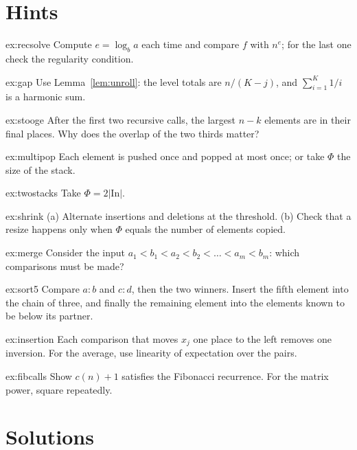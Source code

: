 \section{Hints}

\begin{hint}{ex:recsolve}
Compute $e=\log_ba$ each time and compare $f$ with $n^e$; for the last one check the regularity condition.
\end{hint}
\begin{hint}{ex:gap}
Use Lemma~\ref{lem:unroll}: the level totals are $n/(K-j)$, and $\sum_{i=1}^K1/i$ is a harmonic sum.
\end{hint}
\begin{hint}{ex:stooge}
After the first two recursive calls, the largest $n-k$ elements are in their final places. Why does the overlap of the two thirds matter?
\end{hint}
\begin{hint}{ex:multipop}
Each element is pushed once and popped at most once; or take $\Phi$ the size of the stack.
\end{hint}
\begin{hint}{ex:twostacks}
Take $\Phi=2|\mathrm{In}|$.
\end{hint}
\begin{hint}{ex:shrink}
(a) Alternate insertions and deletions at the threshold. (b) Check that a resize happens only when $\Phi$ equals the number of elements copied.
\end{hint}
\begin{hint}{ex:merge}
Consider the input $a_1<b_1<a_2<b_2<\dots<a_m<b_m$: which comparisons must be made?
\end{hint}
\begin{hint}{ex:sort5}
Compare $a:b$ and $c:d$, then the two winners. Insert the fifth element into the chain of three, and finally the remaining element into
the elements known to be below its partner.
\end{hint}
\begin{hint}{ex:insertion}
Each comparison that moves $x_j$ one place to the left removes one inversion. For the average, use linearity of expectation over the pairs.
\end{hint}
\begin{hint}{ex:fibcalls}
Show $c(n)+1$ satisfies the Fibonacci recurrence. For the matrix power, square repeatedly.
\end{hint}

\section{Solutions}

